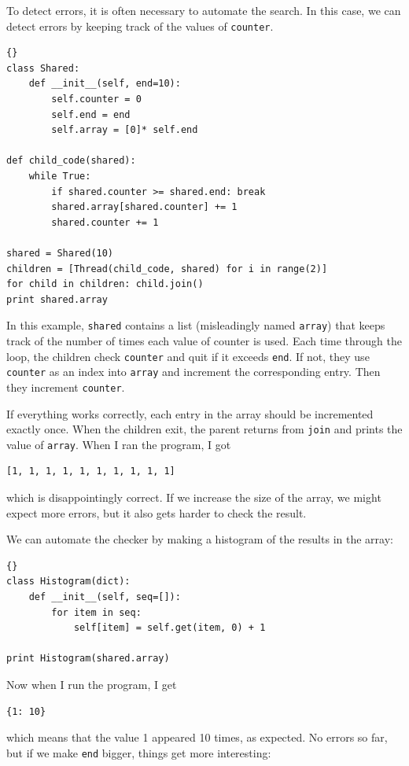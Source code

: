 \documentclass{book}
\begin{document}
To detect errors, it is often necessary to automate the search.
In this case, we can detect errors by keeping track of the values
of {\tt counter}.

\begin{lstlisting}[title={}]{}
class Shared:
    def __init__(self, end=10):
        self.counter = 0
        self.end = end
        self.array = [0]* self.end

def child_code(shared):
    while True:
        if shared.counter >= shared.end: break
        shared.array[shared.counter] += 1
        shared.counter += 1

shared = Shared(10)
children = [Thread(child_code, shared) for i in range(2)]
for child in children: child.join()
print shared.array
\end{lstlisting}

In this example, {\tt shared} contains a list (misleadingly
named {\tt array}) that keeps track of the number of times
each value of counter is used.
Each time through the loop, the children check {\tt counter}
and quit if it exceeds {\tt end}.  If not, they use {\tt counter}
as an index into {\tt array} and increment the corresponding
entry.  Then they increment {\tt counter}.

If everything works correctly, each entry in the array should
be incremented exactly once.  When the children exit, the parent
returns from {\tt join} and prints the value of {\tt array}.
When I ran the program, I got
%
\begin{verbatim}
[1, 1, 1, 1, 1, 1, 1, 1, 1, 1]
\end{verbatim}
%
which is disappointingly correct.  If we increase the size of
the array, we might expect more errors, but it also gets harder
to check the result.

\newpage
We can automate the checker by making
a histogram of the results in the array:

\begin{lstlisting}[title={}]{}
class Histogram(dict):
    def __init__(self, seq=[]):
        for item in seq:
            self[item] = self.get(item, 0) + 1

print Histogram(shared.array)
\end{lstlisting}

Now when I run the program, I get

\begin{verbatim}
{1: 10}
\end{verbatim}
%
which means that the value 1 appeared 10 times, as expected.  No
errors so far, but if we make {\tt end} bigger, things get more
interesting:
\end{document}

